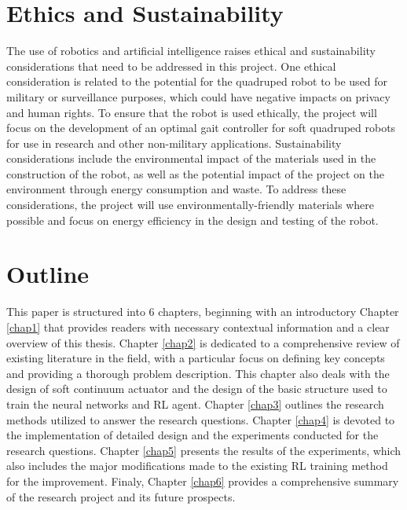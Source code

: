 \section{Ethics and Sustainability}
The use of robotics and artificial intelligence raises ethical and sustainability considerations that need to be addressed in this project. One ethical consideration is related to the potential for the quadruped robot to be used for military or surveillance purposes, which could have negative impacts on privacy and human rights. To ensure that the robot is used ethically, the project will focus on the development of an optimal gait controller for soft quadruped robots for use in research and other non-military applications. Sustainability considerations include the environmental impact of the materials used in the construction of the robot, as well as the potential impact of the project on the environment through energy consumption and waste. To address these considerations, the project will use environmentally-friendly materials where possible and focus on energy efficiency in the design and testing of the robot.

\section{Outline}
This paper is structured into 6 chapters, beginning with an introductory Chapter \ref{chap1} that provides readers with necessary contextual information and a clear overview of this thesis. Chapter \ref{chap2} is dedicated to a comprehensive review of existing literature in the field, with a particular focus on defining key concepts and providing a thorough problem description. This chapter also deals with the design of soft continuum actuator and the design of the basic structure used to train the neural networks and \ac{RL} agent. Chapter \ref{chap3} outlines the research methods utilized to answer the research questions. Chapter \ref{chap4} is devoted to the implementation of detailed design and the experiments conducted for the research questions. Chapter \ref{chap5} presents the results of the experiments, which also includes the major modifications made to the existing \ac{RL} training method for the improvement. Finaly, Chapter \ref{chap6} provides a comprehensive summary of the research project and its future prospects.
